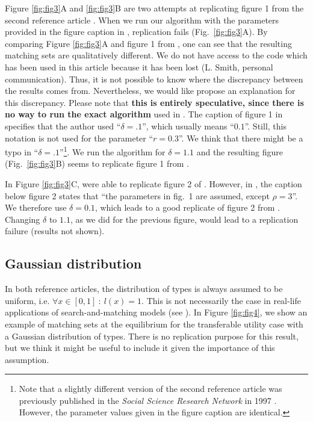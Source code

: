 Figure \ref{fig:fig3}A and \ref{fig:fig3}B are two attempts at replicating figure 1 from the second reference article \citep{smith_marriage_2006}. When we run our algorithm with the parameters provided in the figure caption in \citep{smith_marriage_2006}, replication fails (Fig.~\ref{fig:fig3}A). By comparing Figure \ref{fig:fig3}A and figure 1 from \citep{smith_marriage_2006}, one can see that the resulting matching sets are qualitatively different. We do not have access to the code which has been used in this article because it has been lost (L. Smith, personal communication). Thus, it is not possible to know where the discrepancy between the results comes from. Nevertheless, we would like propose an explanation for this discrepancy. Please note that \textbf{this is entirely speculative, since there is no way to run the exact algorithm} used in \citep{smith_marriage_2006}. The caption of figure 1 in \citep{smith_marriage_2006} specifies that the author used ``$\delta=.1$'', which usually means ``$0.1$''. Still, this notation is not used for the parameter ``$r=0.3$''. We think that there might be a typo in ``$\delta=.1$''\footnote{Note that a slightly different version of the second reference article \citep{smith_marriage_2006} was previously published in the \textit{Social Science Research Network} in 1997 \citep{smith_marriage_1997}. However, the parameter values given in the figure caption are identical.}. We run the algorithm for $\delta=1.1$ and the resulting figure (Fig.~\ref{fig:fig3}B) seems to replicate figure 1 from \citep{smith_marriage_2006}.

In Figure \ref{fig:fig3}C, were able to replicate figure 2 of \citep{smith_marriage_2006}. However, in \citep{smith_marriage_2006}, the caption below figure 2 states that ``the parameters in fig.~1 are assumed, except $\rho=3$''. We therefore use $\delta=0.1$, which leads to a good replicate of figure 2 from \citep{smith_marriage_2006}. Changing $\delta$ to $1.1$, as we did for the previous figure, would lead to a replication failure (results not shown).


\subsection*{Gaussian distribution}

In both reference articles, the distribution of types is always assumed to be uniform, i.e. $\forall x \in [0,1] \ : \ l(x)=1$. This is not necessarily the case in real-life applications of search-and-matching models (see \citep{hagedorn_identifying_2017}). In Figure \ref{fig:fig4}, we show an example of matching sets at the equilibrium for the transferable utility case with a Gaussian distribution of types. There is no replication purpose for this result, but we think it might be useful to include it given the importance of this assumption.

